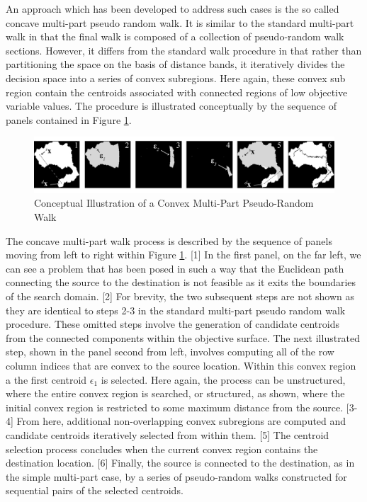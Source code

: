 An approach which has been developed to address such cases is the so called concave multi-part pseudo random walk. It is similar to the standard multi-part walk in that the final walk is composed of a collection of pseudo-random walk sections. However, it differs from the standard walk procedure in that rather than partitioning the space on the basis of distance bands, it iteratively divides the decision space into a series of convex subregions. Here again, these convex sub region contain the centroids associated with connected regions of low objective variable values. The procedure is illustrated conceptually by the sequence of panels contained in Figure \ref{fig:convex-multi-part-pseudo-random-walk-example}.
            
            \begin{figure}[!h]
            \centering
            \includegraphics[width=5.5in]{figures/convex-multi-part-pseudo-random-walk-example.png}
            \caption[Conceptual Illustration of a Convex Multi-Part Pseudo-Random Walk]{Conceptual Illustration of a Convex Multi-Part Pseudo-Random Walk}
            \label{fig:convex-multi-part-pseudo-random-walk-example}
            \end{figure}
            
The concave multi-part walk process is described by the sequence of panels moving from left to right within Figure \ref{fig:convex-multi-part-pseudo-random-walk-example}. [1] In the first panel, on the far left, we can see a problem that has been posed in such a way that the Euclidean path connecting the source to the destination is not feasible as it exits the boundaries of the search domain. [2]  For brevity, the two subsequent steps are not shown as they are identical to steps 2-3 in the standard multi-part pseudo random walk procedure. These omitted steps involve the generation of candidate centroids from the connected components within the objective surface. The next illustrated step, shown in the panel second from left, involves computing all of the row column indices that are convex to the source location. Within this convex region a the first centroid $\epsilon_1$ is selected. Here again, the process can be unstructured, where the entire convex region is searched, or structured, as shown, where the initial convex region is restricted to some maximum distance from the source. [3-4] From here, additional non-overlapping convex subregions are computed and candidate centroids iteratively selected from within them. [5] The centroid selection process concludes when the current convex region contains the destination location. [6] Finally, the source is connected to the destination, as in the simple multi-part case, by a series of pseudo-random walks constructed for sequential pairs of the selected centroids.

